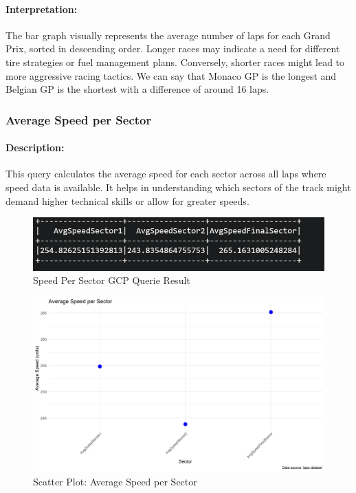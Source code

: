 \documentclass{article}
\begin{document}
\paragraph{Interpretation:}
The bar graph visually represents the average number of laps for each Grand Prix, sorted in descending order. Longer races may indicate a need for different tire strategies or fuel management plans. Conversely, shorter races might lead to more aggressive racing tactics. We can say that Monaco GP is the longest and Belgian GP is the shortest with a difference of around 16 laps.


\subsubsection{Average Speed per Sector}
\paragraph{Description:}
This query calculates the average speed for each sector across all laps where speed data is available. It helps in understanding which sectors of the track might demand higher technical skills or allow for greater speeds.

\begin{figure}[H]
    \centering
    \includegraphics[width=\textwidth]{average-speed-sector.png}
    \caption{Speed Per Sector GCP Querie Result}
\end{figure}

\begin{figure}[H]
    \centering
    \includegraphics[width=\textwidth]{average_speeds_per_sector_plot.png}
    \caption{Scatter Plot: Average Speed per Sector}
\end{figure}
\end{document}
